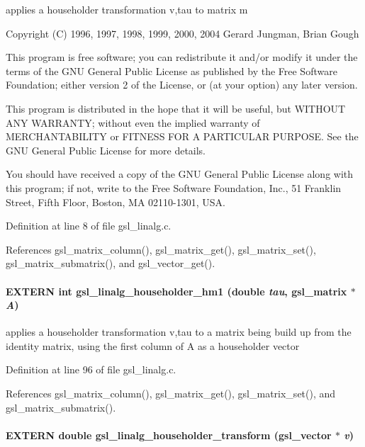 applies a householder transformation v,tau to matrix m

Copyright (C) 1996, 1997, 1998, 1999, 2000, 2004 Gerard Jungman, Brian Gough

This program is free software; you can redistribute it and/or modify it under the terms of the GNU General Public License as published by the Free Software Foundation; either version 2 of the License, or (at your option) any later version.

This program is distributed in the hope that it will be useful, but WITHOUT ANY WARRANTY; without even the implied warranty of MERCHANTABILITY or FITNESS FOR A PARTICULAR PURPOSE. See the GNU General Public License for more details.

You should have received a copy of the GNU General Public License along with this program; if not, write to the Free Software Foundation, Inc., 51 Franklin Street, Fifth Floor, Boston, MA 02110-1301, USA. 

Definition at line 8 of file gsl\_\-linalg.c.

References gsl\_\-matrix\_\-column(), gsl\_\-matrix\_\-get(), gsl\_\-matrix\_\-set(), gsl\_\-matrix\_\-submatrix(), and gsl\_\-vector\_\-get().
\paragraph[gsl\_\-linalg\_\-householder\_\-hm1]{\setlength{\rightskip}{0pt plus 5cm}EXTERN int gsl\_\-linalg\_\-householder\_\-hm1 (double {\em tau}, \/  gsl\_\-matrix $\ast$ {\em A})}\hfill\label{group__nr_g9c5d4686ca19e3e44f6483c333766551}




applies a householder transformation v,tau to a matrix being build up from the identity matrix, using the first column of A as a householder vector 

Definition at line 96 of file gsl\_\-linalg.c.

References gsl\_\-matrix\_\-column(), gsl\_\-matrix\_\-get(), gsl\_\-matrix\_\-set(), and gsl\_\-matrix\_\-submatrix().
\paragraph[gsl\_\-linalg\_\-householder\_\-transform]{\setlength{\rightskip}{0pt plus 5cm}EXTERN double gsl\_\-linalg\_\-householder\_\-transform (gsl\_\-vector $\ast$ {\em v})}\hfill\label{group__nr_g0ef4fef16755cdbf60e7c66d878354b0}




